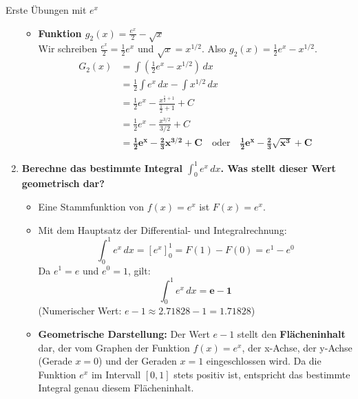 \begin{loesungsumgebung}{Erste Übungen mit $e^x$}
\begin{enumerate}[label=(\alph*)]
\begin{itemize}
        \item \textbf{Funktion $g_2(x) = \frac{e^x}{2} - \sqrt{x}$} \\
        Wir schreiben $\frac{e^x}{2} = \frac{1}{2}e^x$ und $\sqrt{x} = x^{1/2}$. Also $g_2(x) = \frac{1}{2}e^x - x^{1/2}$.
        \begin{align*} G_2(x) &= \int \left(\frac{1}{2}e^x - x^{1/2}\right) \,dx \\ &= \frac{1}{2}\int e^x \,dx - \int x^{1/2} \,dx \\ &= \frac{1}{2}e^x - \frac{x^{\frac{1}{2}+1}}{\frac{1}{2}+1} + C \\ &= \frac{1}{2}e^x - \frac{x^{3/2}}{3/2} + C \\ &= \mathbf{\frac{1}{2}e^x - \frac{2}{3}x^{3/2} + C} \quad \text{oder} \quad \mathbf{\frac{1}{2}e^x - \frac{2}{3}\sqrt{x^3} + C} \end{align*}
    \end{itemize}

    \item \textbf{Berechne das bestimmte Integral $\int_0^1 e^x \,dx$. Was stellt dieser Wert geometrisch dar?}
    \begin{itemize}
        \item Eine Stammfunktion von $f(x)=e^x$ ist $F(x)=e^x$.
        \item Mit dem Hauptsatz der Differential- und Integralrechnung:
        $$ \int_0^1 e^x \,dx = [e^x]_0^1 = F(1) - F(0) = e^1 - e^0 $$
        Da $e^1=e$ und $e^0=1$, gilt:
        $$ \int_0^1 e^x \,dx = \mathbf{e - 1} $$
        (Numerischer Wert: $e-1 \approx 2.71828 - 1 = 1.71828$)
        \item \textbf{Geometrische Darstellung:} Der Wert $e-1$ stellt den \textbf{Flächeninhalt} dar, der vom Graphen der Funktion $f(x)=e^x$, der x-Achse, der y-Achse (Gerade $x=0$) und der Geraden $x=1$ eingeschlossen wird. Da die Funktion $e^x$ im Intervall $[0,1]$ stets positiv ist, entspricht das bestimmte Integral genau diesem Flächeninhalt.
    \end{itemize}
\end{enumerate}

\end{loesungsumgebung}

